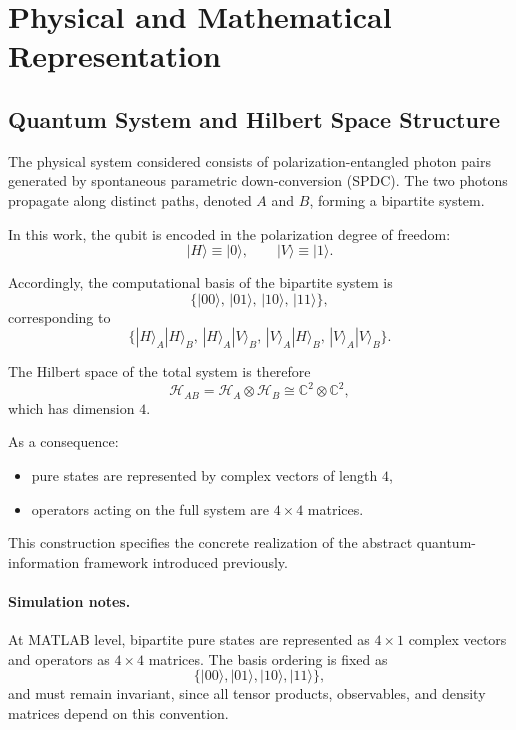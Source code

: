\documentclass[a4paper]{article}
\begin{document}
\section{Physical and Mathematical Representation}

\subsection{Quantum System and Hilbert Space Structure}

The physical system considered consists of polarization-entangled photon pairs generated by spontaneous parametric down-conversion (SPDC). The two photons propagate along distinct paths, denoted \(A\) and \(B\), forming a bipartite system.

In this work, the qubit is encoded in the polarization degree of freedom:
\[
|H\rangle \equiv |0\rangle,
\qquad
|V\rangle \equiv |1\rangle.
\]

Accordingly, the computational basis of the bipartite system is
\[
\{
|00\rangle,\,
|01\rangle,\,
|10\rangle,\,
|11\rangle
\},
\]
corresponding to
\[
\{
|H\rangle_A |H\rangle_B,\,
|H\rangle_A |V\rangle_B,\,
|V\rangle_A |H\rangle_B,\,
|V\rangle_A |V\rangle_B
\}.
\]

The Hilbert space of the total system is therefore
\[
\mathcal{H}_{AB} = \mathcal{H}_A \otimes \mathcal{H}_B
\cong \mathbb{C}^2 \otimes \mathbb{C}^2,
\]
which has dimension \(4\).

As a consequence:
\begin{itemize}
    \item pure states are represented by complex vectors of length \(4\),
    \item operators acting on the full system are \(4 \times 4\) matrices.
\end{itemize}

This construction specifies the concrete realization of the abstract quantum-information framework introduced previously.

\paragraph{Simulation notes.}
At MATLAB level, bipartite pure states are represented as \(4 \times 1\) complex vectors and operators as \(4 \times 4\) matrices. The basis ordering is fixed as
\[
\{|00\rangle,|01\rangle,|10\rangle,|11\rangle\},
\]
and must remain invariant, since all tensor products, observables, and density matrices depend on this convention.
\end{document}
